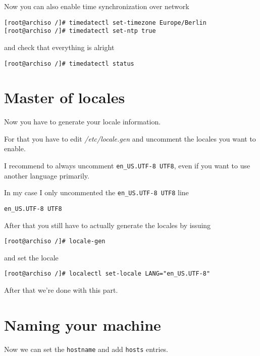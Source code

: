 \documentclass[9pt]{report}
\newenvironment{NOTE}
{\begin{tcolorbox}[colback=admonitionBG,coltitle=draculaFG,colframe=draculaBlue,colbacktitle=draculaBlue,title=NOTE]}
{\end{tcolorbox}}
\begin{document}
Now you can also enable time synchronization over network


\begin{verbatim}
[root@archiso /]# timedatectl set-timezone Europe/Berlin
[root@archiso /]# timedatectl set-ntp true
\end{verbatim}

and check that everything is alright


\begin{verbatim}
[root@archiso /]# timedatectl status
\end{verbatim}


\newpage

\hypertarget{x-master-of-locales}{\section{Master of locales}}
Now you have to generate your locale information.


For that you have to edit \textit{/etc/locale.gen} and uncomment the locales you want to enable.


\begin{NOTE}
    I recommend to always uncomment \texttt{en\_US.UTF-8 UTF8}, even if you want to use another language primarily.

\end{NOTE}
In my case I only uncommented the \texttt{en\_US.UTF-8 UTF8} line


\begin{verbatim}
en_US.UTF-8 UTF8
\end{verbatim}

After that you still have to actually generate the locales by issuing


\begin{verbatim}
[root@archiso /]# locale-gen
\end{verbatim}

and set the locale


\begin{verbatim}
[root@archiso /]# localectl set-locale LANG="en_US.UTF-8"
\end{verbatim}

After that we’re done with this part.



\newpage

\hypertarget{x-naming-your-machine}{\section{Naming your machine}}
Now we can set the \texttt{hostname} and add \texttt{hosts} entries.
\end{document}
